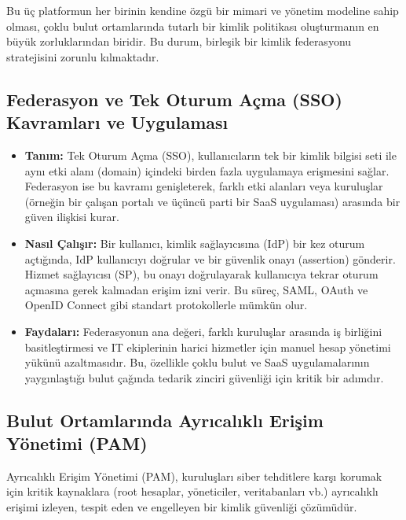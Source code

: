 Bu üç platformun her birinin kendine özgü bir mimari ve yönetim modeline sahip olması, çoklu bulut ortamlarında tutarlı bir kimlik politikası oluşturmanın en büyük zorluklarından biridir. Bu durum, birleşik bir kimlik federasyonu stratejisini zorunlu kılmaktadır.

\subsection{Federasyon ve Tek Oturum Açma (SSO) Kavramları ve Uygulaması}
\begin{itemize}
    \item \textbf{Tanım:} Tek Oturum Açma (SSO), kullanıcıların tek bir kimlik bilgisi seti ile aynı etki alanı (domain) içindeki birden fazla uygulamaya erişmesini sağlar. Federasyon ise bu kavramı genişleterek, farklı etki alanları veya kuruluşlar (örneğin bir çalışan portalı ve üçüncü parti bir SaaS uygulaması) arasında bir güven ilişkisi kurar.
    \item \textbf{Nasıl Çalışır:} Bir kullanıcı, kimlik sağlayıcısına (IdP) bir kez oturum açtığında, IdP kullanıcıyı doğrular ve bir güvenlik onayı (assertion) gönderir. Hizmet sağlayıcısı (SP), bu onayı doğrulayarak kullanıcıya tekrar oturum açmasına gerek kalmadan erişim izni verir. Bu süreç, SAML, OAuth ve OpenID Connect gibi standart protokollerle mümkün olur.
    \item \textbf{Faydaları:} Federasyonun ana değeri, farklı kuruluşlar arasında iş birliğini basitleştirmesi ve IT ekiplerinin harici hizmetler için manuel hesap yönetimi yükünü azaltmasıdır. Bu, özellikle çoklu bulut ve SaaS uygulamalarının yaygınlaştığı bulut çağında tedarik zinciri güvenliği için kritik bir adımdır.
\end{itemize}

\subsection{Bulut Ortamlarında Ayrıcalıklı Erişim Yönetimi (PAM)}
Ayrıcalıklı Erişim Yönetimi (PAM), kuruluşları siber tehditlere karşı korumak için kritik kaynaklara (root hesaplar, yöneticiler, veritabanları vb.) ayrıcalıklı erişimi izleyen, tespit eden ve engelleyen bir kimlik güvenliği çözümüdür.

